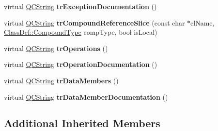 \begin{DoxyCompactItemize}
\mbox{\label{class_translator_spanish_aa4f533dacba99595a2d2b3c9c3a4844f}} 
virtual \mbox{\hyperlink{class_q_c_string}{Q\+C\+String}} {\bfseries tr\+Exception\+Documentation} ()
\item 
\mbox{\label{class_translator_spanish_adb533b51e95f96e014356566af21515d}} 
virtual \mbox{\hyperlink{class_q_c_string}{Q\+C\+String}} {\bfseries tr\+Compound\+Reference\+Slice} (const char $\ast$cl\+Name, \mbox{\hyperlink{class_class_def_ae70cf86d35fe954a94c566fbcfc87939}{Class\+Def\+::\+Compound\+Type}} comp\+Type, bool is\+Local)
\item 
\mbox{\label{class_translator_spanish_a43bfc6bb543e1453a71bb533d59c8f9f}} 
virtual \mbox{\hyperlink{class_q_c_string}{Q\+C\+String}} {\bfseries tr\+Operations} ()
\item 
\mbox{\label{class_translator_spanish_a34329847e6aaae26f0a3a99a626381cb}} 
virtual \mbox{\hyperlink{class_q_c_string}{Q\+C\+String}} {\bfseries tr\+Operation\+Documentation} ()
\item 
\mbox{\label{class_translator_spanish_a7b916bc7ef2d6ebc30ebc290594993ad}} 
virtual \mbox{\hyperlink{class_q_c_string}{Q\+C\+String}} {\bfseries tr\+Data\+Members} ()
\item 
\mbox{\label{class_translator_spanish_a1db2b6d21962b13371d3355bdfe449c8}} 
virtual \mbox{\hyperlink{class_q_c_string}{Q\+C\+String}} {\bfseries tr\+Data\+Member\+Documentation} ()
\end{DoxyCompactItemize}
\subsection*{Additional Inherited Members}


